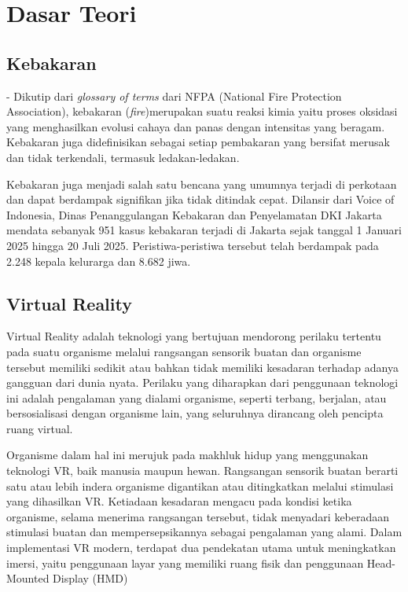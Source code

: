 \section{Dasar Teori}

\subsection{Kebakaran}

- Dikutip dari \textit{glossary of terms} dari NFPA (National Fire Protection Association), kebakaran  (\textit{fire})merupakan suatu reaksi kimia yaitu proses oksidasi yang menghasilkan evolusi cahaya dan panas dengan intensitas yang beragam.  Kebakaran juga didefinisikan sebagai setiap pembakaran yang bersifat merusak dan tidak terkendali, termasuk ledakan-ledakan\cite{nfpa2024glossary}.

Kebakaran juga menjadi salah satu bencana yang umumnya terjadi di perkotaan dan dapat berdampak signifikan jika tidak ditindak cepat. Dilansir dari Voice of Indonesia, Dinas Penanggulangan Kebakaran dan Penyelamatan DKI Jakarta mendata sebanyak 951 kasus kebakaran terjadi di Jakarta sejak tanggal 1 Januari 2025 hingga 20 Juli 2025. Peristiwa-peristiwa tersebut telah berdampak pada 2.248 kepala kelurarga dan 8.682 jiwa\cite{voi2025kebakaran}.




\subsection{Virtual Reality}
Virtual Reality adalah teknologi yang bertujuan mendorong perilaku tertentu pada suatu organisme melalui rangsangan sensorik buatan dan organisme tersebut memiliki sedikit atau bahkan tidak memiliki kesadaran terhadap adanya gangguan dari dunia nyata. Perilaku yang diharapkan dari penggunaan teknologi ini adalah pengalaman yang dialami organisme, seperti terbang, berjalan, atau bersosialisasi dengan organisme lain, yang seluruhnya dirancang oleh pencipta ruang virtual.

Organisme dalam hal ini merujuk pada makhluk hidup yang menggunakan teknologi VR, baik manusia maupun hewan. Rangsangan sensorik buatan berarti satu atau lebih indera organisme digantikan atau ditingkatkan melalui stimulasi yang dihasilkan VR. Ketiadaan kesadaran mengacu pada kondisi ketika organisme, selama menerima rangsangan tersebut, tidak menyadari keberadaan stimulasi buatan dan mempersepsikannya sebagai pengalaman yang alami.
 Dalam implementasi VR modern, terdapat dua pendekatan utama untuk meningkatkan imersi, yaitu penggunaan layar yang memiliki ruang fisik dan penggunaan Head-Mounted Display (HMD)

